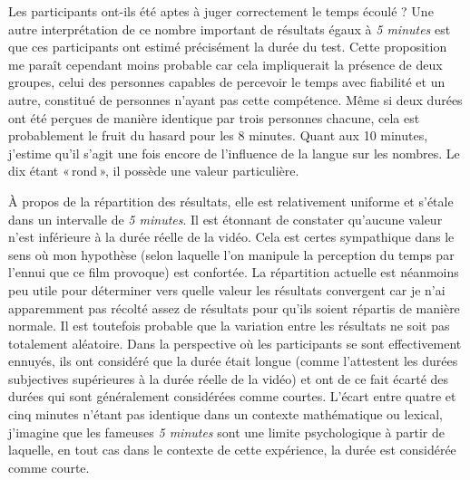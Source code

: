 \documentclass[12pt,fleqn,oneside,french,openany]{book} %
\begin{document}
Les participants ont-ils été aptes à juger correctement le temps écoulé ? Une autre interprétation de ce nombre important de résultats égaux à \emph{5 minutes} est que ces participants ont estimé précisément la durée du test. Cette proposition me paraît cependant moins probable car cela impliquerait la présence de deux groupes, celui des personnes capables de percevoir le temps avec fiabilité et un autre, constitué de personnes n'ayant pas cette compétence. Même si deux durées ont été perçues de manière identique par trois personnes chacune, cela est probablement le fruit du hasard pour les 8 minutes. Quant aux 10 minutes, j'estime qu'il s'agit une fois encore de l'influence de la langue sur les nombres. Le dix étant «\,rond\,», il possède une valeur particulière.

À propos de la répartition des résultats, elle est relativement uniforme et s'étale dans un intervalle de \emph{5 minutes}. Il est étonnant de constater qu'aucune valeur n'est inférieure à la durée réelle de la vidéo. Cela est certes sympathique dans le sens où mon hypothèse (selon laquelle l'on manipule la perception du temps par l'ennui que ce film provoque) est confortée. La répartition actuelle est néanmoins peu utile pour déterminer vers quelle valeur les résultats convergent car je n'ai apparemment pas récolté assez de résultats pour qu'ils soient répartis de manière normale. Il est toutefois probable que la variation entre les résultats ne soit pas totalement aléatoire. Dans la perspective où les participants se sont effectivement ennuyés, ils ont considéré que la durée était longue (comme l'attestent les durées subjectives supérieures à la durée réelle de la vidéo) et ont de ce fait écarté des durées qui sont généralement considérées comme courtes. L'écart entre quatre et cinq minutes n'étant pas identique dans un contexte mathématique ou lexical, j'imagine que les fameuses \emph{5 minutes} sont une limite psychologique à partir de laquelle, en tout cas dans le contexte de cette expérience, la durée est considérée comme courte. 
\end{document}
